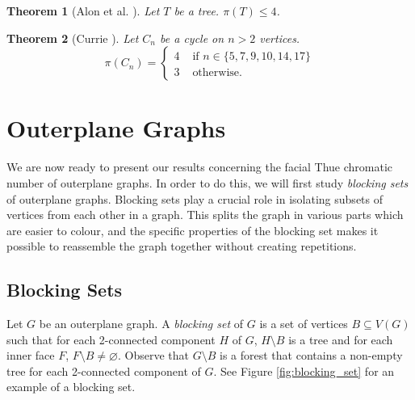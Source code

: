 \documentclass{patmorin}
\let\emptyset\varnothing
\newtheorem{theorem}{Theorem}[section]
\begin{document}
\begin{theorem}[Alon et al. \cite{alon2002nonrepetitive}]
 Let $T$ be a tree. $\pi(T) \leq 4$.
 \label{thm:four_colouring_trees}
\end{theorem}

\begin{theorem}[Currie \cite{currie2002cycle18}]
 Let $C_n$ be a cycle on $n > 2$ vertices. 
 $$
 \pi(C_n) = \begin{cases}
             4 & \text{ if } n \in \{5,7,9,10,14,17\} \\
             3 & \text{ otherwise. }
            \end{cases}$$
 \label{thm:colouring_cycles}
\end{theorem}

\section{Outerplane Graphs}

We are now ready to present our results concerning the facial Thue chromatic number of outerplane graphs.
In order to do this, we will first study \emph{blocking sets} of outerplane graphs. Blocking sets play a crucial role in isolating subsets of vertices from each other in a graph. This splits the graph in various parts which are easier to colour, and the specific properties of the blocking set makes it possible to reassemble the graph together without creating repetitions. 

\subsection{Blocking Sets}

Let $G$ be an outerplane graph. A \emph{blocking set} of $G$ is a set
of vertices $B \subseteq V(G)$ such that for each 2-connected component
$H$ of $G$, $H \setminus B$ is a tree and for each inner face $F$,
$F \setminus B \not= \emptyset$. 
Observe that $G\setminus B$ is a forest that contains a non-empty tree
for each 2-connected component of $G$.
See Figure \ref{fig:blocking_set} for an example of a blocking set. 
\end{document}
